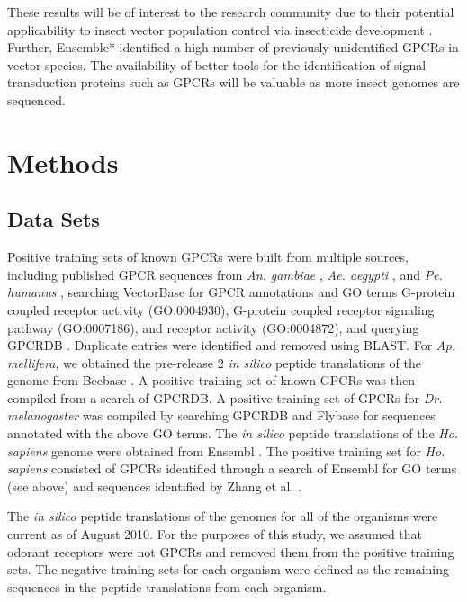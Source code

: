 These results will be of interest to the research community due to their potential applicability to insect vector population control via insecticide development \cite{Meyer2012}.  Further, Ensemble* identified a high number of previously-unidentified GPCRs in vector species.  The availability of better tools for the identification of signal transduction proteins such as GPCRs will be valuable as more insect genomes are sequenced.

\section{Methods}
	
\subsection{Data Sets}

Positive training sets of known GPCRs were built from multiple sources, including published GPCR sequences from \emph{An. gambiae} \cite{Hill2002, Holt2002},  \emph{Ae. aegypti} \cite{Nene2007}, and \emph{Pe. humanus} \cite{Kirkness2010}, searching VectorBase \cite{Lawson2007, Lawson2009} for GPCR annotations and GO terms G-protein coupled receptor activity (GO:0004930), G-protein coupled receptor signaling pathway (GO:0007186), and receptor activity (GO:0004872), and querying GPCRDB \cite{Horn2003,Vroling2011}. Duplicate entries were identified and removed using BLAST. For \emph{Ap. mellifera}, we obtained the pre-release 2 \emph{in silico} peptide translations of the genome from Beebase \cite{Munoz-Torres2011, Weinstock2006}.  A positive training set of known GPCRs was then compiled from a search of GPCRDB.  A positive training set of GPCRs for \emph{Dr. melanogaster} was compiled by searching GPCRDB and Flybase \cite{Adams2000, Gelbart1997, Crosby2007, Tweedie2009, McQuilton2011} for sequences annotated with the above GO terms.  The \textit{in silico} peptide translations of the \emph{Ho. sapiens} genome were obtained from Ensembl \cite{Hubbard2002}.  The positive training set for \emph{Ho. sapiens} consisted of GPCRs identified through a search of Ensembl for GO terms (see above) and sequences identified by Zhang et al. \cite{Zhang2006}.

The \textit{in silico} peptide translations of the genomes for all of the organisms were current as of August 2010.  For the purposes of this study, we assumed that odorant receptors were not GPCRs \cite{Sato2008, Touhara2009, Wicher2008} and removed them from the positive training sets.  The negative training sets for each organism were defined as the remaining sequences in the peptide translations from each organism.


